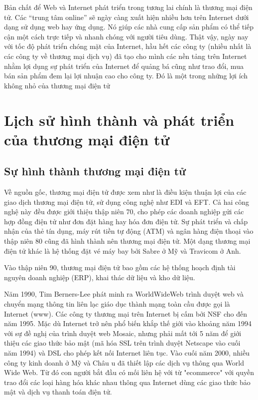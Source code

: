 Bản chất để Web và Internet phát triển trong tương lai chính là thương mại điện tử. Các “trung tâm online” sẽ ngày càng xuất hiện nhiều hơn trên Internet dưới dạng sử dụng web hay ứng dụng. Nó giúp các nhà cung cấp sản phẩm có thể tiếp cận một cách trực tiếp và nhanh chóng với người tiêu dùng. Thật vậy, ngày nay với tốc độ phát triển chóng mặt của Internet, hầu hết các công ty (nhiều nhất là các công ty về thương mại dịch vụ) đã tạo cho mình các nền tảng trên Internet nhằm lợi dụng sự phát triển của Internet để quảng bá cũng như trao đổi, mua bán sản phẩm đem lại lợi nhuận cao cho công ty. Đó là một trong những lợi ích không nhỏ của thương mại điện tử

\section{Lịch sử hình thành và phát triển của thương mại điện tử }
\subsection{Sự hình thành thương mại điện tử}
Về nguồn gốc, thương mại điện tử được xem như là điều kiện thuận lợi của các giao dịch thương mại điện tử, sử dụng công nghệ như EDI và EFT. Cả hai công nghệ này đều được giới thiệu thập niên 70, cho phép các doanh nghiệp gửi các hợp đồng điện tử như đơn đặt hàng hay hóa đơn điện tử. Sự phát triển và chấp nhận của thẻ tín dụng, máy rút tiền tự động (ATM) và ngân hàng điện thoại vào thập niên 80 cũng đã hình thành nên thương mại điện tử. Một dạng thương mại điện tử khác là hệ thống đặt vé máy bay bởi Sabre ở Mỹ và Travicom ở Anh.

Vào thập niên 90, thương mại điện tử bao gồm các hệ thống hoạch định tài nguyên doanh nghiệp (ERP), khai thác dữ liệu và kho dữ liệu.

Năm 1990, Tim Berners-Lee phát minh ra WorldWideWeb trình duyệt web và chuyển mạng thông tin liên lạc giáo dục thành mạng toàn cầu được gọi là Internet (www). Các công ty thương mại trên Internet bị cấm bởi NSF cho đến năm 1995. Mặc dù Internet trở nên phổ biến khắp thế giới vào khoảng năm 1994 với sự đề nghị của trình duyệt web Mosaic, nhưng phải mất tới 5 năm để giới thiệu các giao thức bảo mật (mã hóa SSL trên trình duyệt Netscape vào cuối năm 1994) và DSL cho phép kết nối Internet liên tục. Vào cuối năm 2000, nhiều công ty kinh doanh ở Mỹ và Châu  u đã thiết lập các dịch vụ thông qua World Wide Web. Từ đó con người bắt đầu có mối liên hệ với từ "ecommerce" với quyền trao đổi các loại hàng hóa khác nhau thông qua Internet dùng các giao thức bảo mật và dịch vụ thanh toán điện tử.


